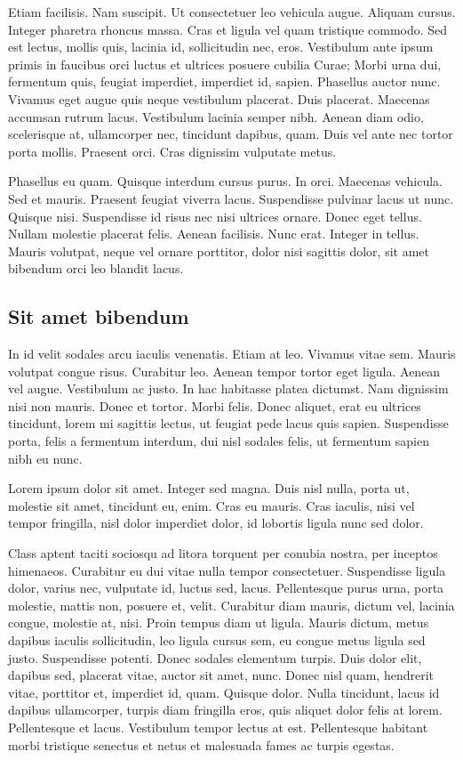\documentclass[../hdr.tex]{subfiles}
\begin{document}
Etiam facilisis. Nam suscipit. Ut consectetuer leo vehicula augue. Aliquam
cursus. Integer pharetra rhoncus massa. Cras et ligula vel quam tristique
commodo. Sed est lectus, mollis quis, lacinia id, sollicitudin nec, eros.
Vestibulum ante ipsum primis in faucibus orci luctus et ultrices posuere cubilia
Curae; Morbi urna dui, fermentum quis, feugiat imperdiet, imperdiet id, sapien.
Phasellus auctor nunc. Vivamus eget augue quis neque vestibulum placerat. Duis
placerat. Maecenas accumsan rutrum lacus. Vestibulum lacinia semper nibh. Aenean
diam odio, scelerisque at, ullamcorper nec, tincidunt dapibus, quam. Duis vel
ante nec tortor porta mollis. Praesent orci. Cras dignissim vulputate metus.

Phasellus eu quam. Quisque interdum cursus purus. In orci. Maecenas vehicula.
Sed et mauris. Praesent feugiat viverra lacus. Suspendisse pulvinar lacus ut
nunc. Quisque nisi. Suspendisse id risus nec nisi ultrices ornare. Donec eget
tellus. Nullam molestie placerat felis. Aenean facilisis. Nunc erat. Integer in
tellus. Mauris volutpat, neque vel ornare porttitor, dolor nisi sagittis dolor,
sit amet bibendum orci leo blandit lacus.

\subsection{Sit amet bibendum}

In id velit sodales arcu iaculis venenatis. Etiam at leo. Vivamus vitae sem.
Mauris volutpat congue risus. Curabitur leo. Aenean tempor tortor eget ligula.
Aenean vel augue. Vestibulum ac justo. In hac habitasse platea dictumst. Nam
dignissim nisi non mauris. Donec et tortor. Morbi felis. Donec aliquet, erat eu
ultrices tincidunt, lorem mi sagittis lectus, ut feugiat pede lacus quis sapien.
Suspendisse porta, felis a fermentum interdum, dui nisl sodales felis, ut
fermentum sapien nibh eu nunc.

Lorem ipsum dolor sit amet. Integer sed magna. Duis nisl nulla, porta ut,
molestie sit amet, tincidunt eu, enim. Cras eu mauris. Cras iaculis, nisi vel
tempor fringilla, nisl dolor imperdiet dolor, id lobortis ligula nunc sed dolor.

Class aptent taciti sociosqu ad litora torquent per conubia nostra, per inceptos
himenaeos. Curabitur eu dui vitae nulla tempor consectetuer. Suspendisse ligula
dolor, varius nec, vulputate id, luctus sed, lacus. Pellentesque purus urna,
porta molestie, mattis non, posuere et, velit. Curabitur diam mauris, dictum
vel, lacinia congue, molestie at, nisi. Proin tempus diam ut ligula. Mauris
dictum, metus dapibus iaculis sollicitudin, leo ligula cursus sem, eu congue
metus ligula sed justo. Suspendisse potenti. Donec sodales elementum turpis.
Duis dolor elit, dapibus sed, placerat vitae, auctor sit amet, nunc. Donec nisl
quam, hendrerit vitae, porttitor et, imperdiet id, quam. Quisque dolor. Nulla
tincidunt, lacus id dapibus ullamcorper, turpis diam fringilla eros, quis
aliquet dolor felis at lorem. Pellentesque et lacus. Vestibulum tempor lectus at
est. Pellentesque habitant morbi tristique senectus et netus et malesuada fames
ac turpis egestas. 
\end{document}
